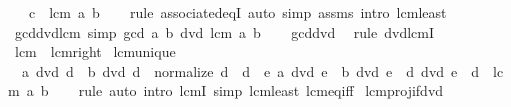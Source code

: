 \begin{isabellebody}
\ \ \ {\isachardoublequoteopen}c\ {\isacharequal}{\kern0pt}\ lcm\ a\ b{\isachardoublequoteclose}\isanewline
%
\isadelimproof
\ \ %
\endisadelimproof
%
\isatagproof
{}\isamarkupfalse%
\ {\isacharparenleft}{\kern0pt}rule\ associated{\isacharunderscore}{\kern0pt}eqI{\isacharparenright}{\kern0pt}\ {\isacharparenleft}{\kern0pt}auto\ simp{\isacharcolon}{\kern0pt}\ assms\ intro{\isacharcolon}{\kern0pt}\ lcm{\isacharunderscore}{\kern0pt}least{\isacharparenright}{\kern0pt}%
\endisatagproof
{\isafoldproof}%
%
\isadelimproof
\isanewline
%
\endisadelimproof
\isanewline
{}\isamarkupfalse%
\ gcd{\isacharunderscore}{\kern0pt}dvd{\isacharunderscore}{\kern0pt}lcm\ {\isacharbrackleft}{\kern0pt}simp{\isacharbrackright}{\kern0pt}{\isacharcolon}{\kern0pt}\ {\isachardoublequoteopen}gcd\ a\ b\ dvd\ lcm\ a\ b{\isachardoublequoteclose}\isanewline
%
\isadelimproof
\ \ %
\endisadelimproof
%
\isatagproof
{}\isamarkupfalse%
\ gcd{\isacharunderscore}{\kern0pt}dvd{}\ \isamarkupfalse%
\ {\isacharparenleft}{\kern0pt}rule\ dvd{\isacharunderscore}{\kern0pt}lcmI{}{\isacharparenright}{\kern0pt}%
\endisatagproof
{\isafoldproof}%
%
\isadelimproof
\isanewline
%
\endisadelimproof
\isanewline
{}\isamarkupfalse%
\ lcm{\isacharunderscore}{\kern0pt}{}\ {\isacharequal}{\kern0pt}\ lcm{\isacharunderscore}{\kern0pt}{}{\isacharunderscore}{\kern0pt}right\isanewline
\isanewline
{}\isamarkupfalse%
\ lcm{\isacharunderscore}{\kern0pt}unique{\isacharcolon}{\kern0pt}\isanewline
\ \ {\isachardoublequoteopen}a\ dvd\ d\ {\isasymand}\ b\ dvd\ d\ {\isasymand}\ normalize\ d\ {\isacharequal}{\kern0pt}\ d\ {\isasymand}\ {\isacharparenleft}{\kern0pt}{\isasymforall}e{\isachardot}{\kern0pt}\ a\ dvd\ e\ {\isasymand}\ b\ dvd\ e\ {\isasymlongrightarrow}\ d\ dvd\ e{\isacharparenright}{\kern0pt}\ {\isasymlongleftrightarrow}\ d\ {\isacharequal}{\kern0pt}\ lcm\ a\ b{\isachardoublequoteclose}\isanewline
%
\isadelimproof
\ \ %
\endisadelimproof
%
\isatagproof
{}\isamarkupfalse%
\ rule\ {\isacharparenleft}{\kern0pt}auto\ intro{\isacharcolon}{\kern0pt}\ lcmI\ simp{\isacharcolon}{\kern0pt}\ lcm{\isacharunderscore}{\kern0pt}least\ lcm{\isacharunderscore}{\kern0pt}eq{\isacharunderscore}{\kern0pt}{}{\isacharunderscore}{\kern0pt}iff{\isacharparenright}{\kern0pt}%
\endisatagproof
{\isafoldproof}%
%
\isadelimproof
\isanewline
%
\endisadelimproof
\isanewline
{}\isamarkupfalse%
\ lcm{\isacharunderscore}{\kern0pt}proj{}{\isacharunderscore}{\kern0pt}if{\isacharunderscore}{\kern0pt}dvd{\isacharcolon}{\kern0pt}\isanewline

\end{isabellebody}
